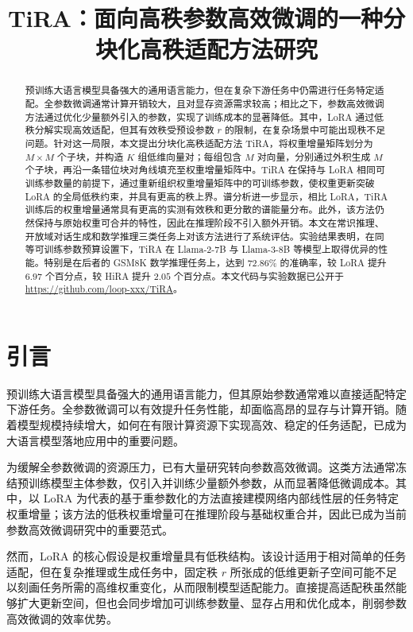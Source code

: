 ﻿\documentclass[UTF8,a4paper,11pt]{ctexart}
\title{TiRA：面向高秩参数高效微调的一种分块化高秩适配方法研究}
\author{}
\date{}
\begin{document}
\pagestyle{empty}
\maketitle

\begin{abstract}
预训练大语言模型具备强大的通用语言能力，但在复杂下游任务中仍需进行任务特定适配。全参数微调通常计算开销较大，且对显存资源需求较高；相比之下，参数高效微调方法通过优化少量额外引入的参数，实现了训练成本的显著降低。其中，LoRA 通过低秩分解实现高效适配，但其有效秩受预设参数 $r$ 的限制，在复杂场景中可能出现秩不足问题。针对这一局限，本文提出分块化高秩适配方法 TiRA，将权重增量矩阵划分为 $M\times M$ 个子块，并构造 $K$ 组低维向量对；每组包含 $M$ 对向量，分别通过外积生成 $M$ 个子块，再沿一条错位块对角线填充至权重增量矩阵中。TiRA 在保持与 LoRA 相同可训练参数量的前提下，通过重新组织权重增量矩阵中的可训练参数，使权重更新突破 LoRA 的全局低秩约束，并具有更高的秩上界。谱分析进一步显示，相比 LoRA，TiRA 训练后的权重增量通常具有更高的实测有效秩和更分散的谱能量分布。此外，该方法仍然保持与原始权重可合并的特性，因此在推理阶段不引入额外开销。本文在常识推理、开放域对话生成和数学推理三类任务上对该方法进行了系统评估。实验结果表明，在同等可训练参数预算设置下，TiRA 在 Llama-2-7B 与 Llama-3-8B 等模型上取得优异的性能。特别是在后者的 GSM8K 数学推理任务上，达到 $72.86\%$ 的准确率，较 LoRA 提升 $6.97$ 个百分点，较 HiRA 提升 $2.05$ 个百分点。本文代码与实验数据已公开于 \url{https://github.com/loop-xxx/TiRA}。
\end{abstract}

\section{引言}

预训练大语言模型具备强大的通用语言能力，但其原始参数通常难以直接适配特定下游任务。全参数微调可以有效提升任务性能，却面临高昂的显存与计算开销。随着模型规模持续增大，如何在有限计算资源下实现高效、稳定的任务适配，已成为大语言模型落地应用中的重要问题。

为缓解全参数微调的资源压力，已有大量研究转向参数高效微调。这类方法通常冻结预训练模型主体参数，仅引入并训练少量额外参数，从而显著降低微调成本。其中，以 LoRA\cite{hu2022lora} 为代表的基于重参数化的方法直接建模网络内部线性层的任务特定权重增量；该方法的低秩权重增量可在推理阶段与基础权重合并，因此已成为当前参数高效微调研究中的重要范式。

然而，LoRA 的核心假设是权重增量具有低秩结构。该设计适用于相对简单的任务适配，但在复杂推理或生成任务中，固定秩 $r$ 所张成的低维更新子空间可能不足以刻画任务所需的高维权重变化，从而限制模型适配能力。直接提高适配秩虽然能够扩大更新空间，但也会同步增加可训练参数量、显存占用和优化成本，削弱参数高效微调的效率优势。
\end{document}
